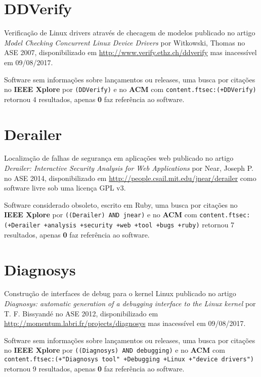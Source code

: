 \section{DDVerify}

Verificação de Linux drivers através de checagem de modelos
publicado no artigo {\it Model Checking Concurrent Linux Device Drivers}
por Witkowski, Thomas
no ASE 2007,
disponibilizado em \url{http://www.verify.ethz.ch/ddverify}
mas inacessível em 09/08/2017.

Software sem informações sobre lançamentos ou releases,
uma busca por citações no {\bf IEEE Xplore} por
\texttt{(DDVerify)}
e no {\bf ACM} com
\texttt{content.ftsec:(+DDVerify)}
retornou
4 resultados, apenas
{\bf 0} faz referência ao software.



\section{Derailer}

Localização de falhas de segurança em aplicações web
publicado no artigo {\it Derailer: Interactive Security Analysis for Web Applications}
por Near, Joseph P.
no ASE 2014,
disponibilizado em \url{http://people.csail.mit.edu/jnear/derailer}
como software livre
sob uma licença GPL v3.

Software considerado obsoleto,
escrito em Ruby,
uma busca por citações no {\bf IEEE Xplore} por
\texttt{((Derailer) AND jnear)}
e no {\bf ACM} com
\texttt{content.ftsec:(+Derailer +analysis +security +web +tool +bugs +ruby)}
retornou
7 resultados, apenas
{\bf 0} faz referência ao software.



\section{Diagnosys}

Construção de interfaces de debug para o kernel Linux
publicado no artigo {\it Diagnosys: automatic generation of a debugging interface to the Linux kernel}
por T. F. Bissyandé
no ASE 2012,
disponibilizado em \url{http://momentum.labri.fr/projects/diagnosys}
mas inacessível em 09/08/2017.

Software sem informações sobre lançamentos ou releases,
uma busca por citações no {\bf IEEE Xplore} por
\texttt{((Diagnosys) AND debugging)}
e no {\bf ACM} com
\texttt{content.ftsec:(+"Diagnosys tool" +Debugging +Linux +"device drivers")}
retornou
9 resultados, apenas
{\bf 0} faz referência ao software.



